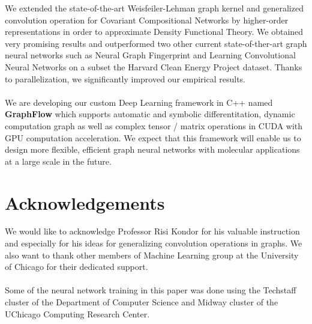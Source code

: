 \documentclass[a4paper]{article}
\begin{document}
We extended the state-of-the-art Weisfeiler-Lehman graph kernel and generalized convolution operation for Covariant Compositional Networks by higher-order representations in order to approximate Density Functional Theory. We obtained very promising results and outperformed two other current state-of-ther-art graph neural networks such as Neural Graph Fingerprint and Learning Convolutional Neural Networks on a subset the Harvard Clean Energy Project dataset. Thanks to parallelization, we significantly improved our empirical results. \\ \\
We are developing our custom Deep Learning framework in C++ named \textbf{GraphFlow} which supports automatic and symbolic differentitation, dynamic computation graph as well as complex tensor / matrix operations in CUDA with GPU computation acceleration. We expect that this framework will enable us to design more flexible, efficient graph neural networks with molecular applications at a large scale in the future.

\section{Acknowledgements}

We would like to acknowledge Professor Risi Kondor for his valuable instruction and especially for his ideas for generalizing convolution operations in graphs. We also want to thank other members of Machine Learning group at the University of Chicago for their dedicated support. \\ \\
Some of the neural network training in this paper was done using the Techstaff cluster of the Department of Computer Science and Midway cluster of the UChicago Computing Research Center.




\end{document}
